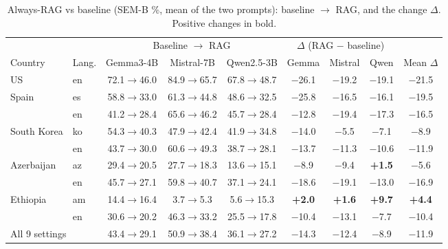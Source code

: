 \documentclass[11pt]{article}
\begin{document}
\begin{table}[h]
\centering
\caption{Always-RAG vs baseline (SEM-B \%, mean of the two prompts): baseline $\rightarrow$ RAG, and
the change $\Delta$. Positive changes in bold.}
\label{tab:rag}
\small
\begin{tabular}{ll|ccc|ccc|c}
\toprule
 & & \multicolumn{3}{c|}{Baseline $\rightarrow$ RAG} & \multicolumn{3}{c|}{$\Delta$ (RAG $-$ baseline)} & \\
Country & Lang. & Gemma3-4B & Mistral-7B & Qwen2.5-3B & Gemma & Mistral & Qwen & Mean $\Delta$ \\
\midrule
US          & en & 72.1$\rightarrow$46.0 & 84.9$\rightarrow$65.7 & 67.8$\rightarrow$48.7 & $-$26.1 & $-$19.2 & $-$19.1 & $-$21.5 \\
Spain       & es & 58.8$\rightarrow$33.0 & 61.3$\rightarrow$44.8 & 48.6$\rightarrow$32.5 & $-$25.8 & $-$16.5 & $-$16.1 & $-$19.5 \\
            & en & 41.2$\rightarrow$28.4 & 65.6$\rightarrow$46.2 & 45.7$\rightarrow$28.4 & $-$12.8 & $-$19.4 & $-$17.3 & $-$16.5 \\
South Korea & ko & 54.3$\rightarrow$40.3 & 47.9$\rightarrow$42.4 & 41.9$\rightarrow$34.8 & $-$14.0 & $-$5.5  & $-$7.1  & $-$8.9 \\
            & en & 43.7$\rightarrow$30.0 & 60.6$\rightarrow$49.3 & 38.7$\rightarrow$28.1 & $-$13.7 & $-$11.3 & $-$10.6 & $-$11.9 \\
Azerbaijan  & az & 29.4$\rightarrow$20.5 & 27.7$\rightarrow$18.3 & 13.6$\rightarrow$15.1 & $-$8.9  & $-$9.4  & \textbf{+1.5} & $-$5.6 \\
            & en & 45.7$\rightarrow$27.1 & 59.8$\rightarrow$40.7 & 37.1$\rightarrow$24.1 & $-$18.6 & $-$19.1 & $-$13.0 & $-$16.9 \\
Ethiopia    & am & 14.4$\rightarrow$16.4 & 3.7$\rightarrow$5.3   & 5.6$\rightarrow$15.3  & \textbf{+2.0} & \textbf{+1.6} & \textbf{+9.7} & \textbf{+4.4} \\
            & en & 30.6$\rightarrow$20.2 & 46.3$\rightarrow$33.2 & 25.5$\rightarrow$17.8 & $-$10.4 & $-$13.1 & $-$7.7  & $-$10.4 \\
\midrule
\multicolumn{2}{l|}{All 9 settings} & 43.4$\rightarrow$29.1 & 50.9$\rightarrow$38.4 & 36.1$\rightarrow$27.2 & $-$14.3 & $-$12.4 & $-$8.9 & $-$11.9 \\
\bottomrule
\end{tabular}
\end{table}
\end{document}

